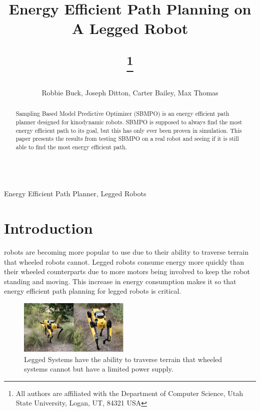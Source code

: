 \documentclass[conference]{IEEEtran}
\begin{document}
\title
{
    Energy Efficient Path Planning on A Legged Robot\\
    \author{Robbie Buck, Joseph Ditton, Carter Bailey, Max Thomas}
    \thanks{All authors are affiliated with the Department of Computer Science, Utah State University, Logan, UT, 84321 USA}
}
\maketitle

\begin{abstract}
    Sampling Based Model Predictive Optimizer (SBMPO) is an energy efficient path planner designed for kinodynamic robots. SBMPO is supposed to always find the most energy efficient path to its goal, but this has only ever been proven in simulation. This paper presents the results from testing SBMPO on a real robot and seeing if it is still able to find the most energy efficient path.
\end{abstract}

\begin{IEEEkeywords}
\\ Energy Efficient Path Planner, Legged Robots
\end{IEEEkeywords}

\section{Introduction}
    
     robots are becoming more popular to use due to their ability to traverse terrain that wheeled robots cannot. Legged robots consume energy more quickly than their wheeled counterparts due to more motors being involved to keep the robot standing and moving. This increase in energy consumption makes it so that energy efficient path planning for legged robots is critical. 
    
    \begin{figure}[ht]
        \centering
        \includegraphics[width=0.47\textwidth]{spot_walking}
        \caption{Legged Systems have the ability to traverse terrain that wheeled systems cannot but have a limited power supply.}
        \label{fig:spot_walking}
    \end{figure}
    
\end{document}
